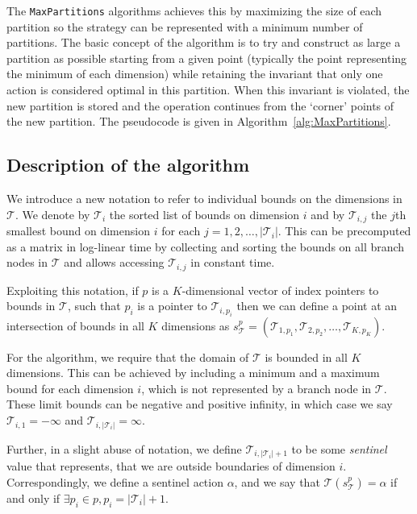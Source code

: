 The \texttt{MaxPartitions} algorithms achieves this by maximizing the size of
each partition so the strategy can be represented with a minimum number of
partitions. The basic concept of the algorithm is to try and construct as large
a partition as possible starting from a given point (typically the point
representing the minimum of each dimension) while retaining the invariant that
only one action is considered optimal in this partition. When this invariant is
violated, the new partition is stored and the operation continues from the
`corner' points of the new partition.  The pseudocode is given in
Algorithm~\ref{alg:MaxPartitions}.

\subsection{Description of the algorithm}%
\label{sub:maxPartsDescription}

We introduce a new notation to refer to individual bounds on the dimensions in
$\mathcal{T}$. We denote by $\mathcal{T}_i$ the sorted list of bounds on
dimension $i$ and by $\mathcal{T}_{i,j}$ the $j$th smallest bound on dimension
$i$ for each $j = 1,2,\ldots,|\mathcal{T}_i|$. This can be precomputed as a
matrix in log-linear time by collecting and sorting the bounds on all branch
nodes in $\mathcal{T}$ and allows accessing $\mathcal{T}_{i,j}$ in constant
time.

Exploiting this notation, if $p$ is a $K$-dimensional vector of index pointers
to bounds in $\mathcal{T}$, such that $p_i$ is a pointer to
$\mathcal{T}_{i,p_i}$ then we can define a point at an intersection of bounds in
all $K$ dimensions as $s^{p}_{\mathcal{T}} =
(\mathcal{T}_{1,p_1},\mathcal{T}_{2,p_2},\ldots,\mathcal{T}_{K,p_K})$.

For the algorithm, we require that the domain of $\mathcal{T}$ is bounded in all
$K$ dimensions. This can be achieved by including a minimum and a maximum bound
for each dimension $i$, which is not represented by a branch node in
$\mathcal{T}$. These limit bounds can be negative and positive infinity, in
which case we say $\mathcal{T}_{i,1} = -\infty$ and
$\mathcal{T}_{i,|\mathcal{T}_{i}|} = \infty$.

Further, in a slight abuse of notation, we define
$\mathcal{T}_{i,|\mathcal{T}_i| + 1}$ to be some \textit{sentinel} value that
represents, that we are outside boundaries of dimension $i$. Correspondingly, we
define a sentinel action $\alpha$, and we say that
$\mathcal{T}(s^p_{\mathcal{T}}) = \alpha$ if and only if $\exists p_i \in p, p_i
= |\mathcal{T}_i| + 1$.

